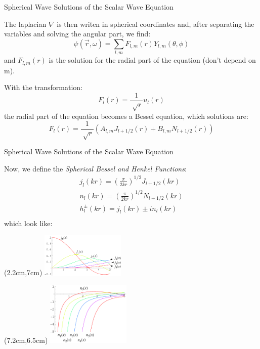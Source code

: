 \documentclass[10pt]{beamer}
\begin{document}
\begin{frame}[fragile]{Spherical Wave Solutions of the Scalar Wave Equation}

The laplacian $\nabla$ is then writen in spherical coordinates and, after separating the variables and solving the angular part, we find:
  \begin{equation*}
    \psi(\vec{r},\omega)=\sum_{l,m}F_{l,m}(r)Y_{l,m}(\theta,\phi)
  \end{equation*}
and $F_{l,m}(r)$ is the solution for the radial part of the equation (don't depend on m).

With the transformation:
  \begin{equation*}
      F_l(r)=\frac{1}{\sqrt[]{r}}u_l(r)
  \end{equation*}
the radial part of the equation becomes a Bessel equation, which solutions are:
\begin{equation*}
F_l(r)=\frac{1}{\sqrt[]{r}}\left( A_{l,m}J_{l+1/2}(r) + B_{l,m}N_{l+1/2}(r) \right)
\end{equation*}

\end{frame}


\begin{frame}[fragile]{Spherical Wave Solutions of the Scalar Wave Equation}

Now, we define the \emph{Spherical Bessel and Henkel Functions}:
  \begin{equation*}
    \begin{split}
      j_l(kr)=\left(\frac{\pi}{2kr}\right)^{1/2}J_{l+1/2}(kr)\\
      n_l(kr)=\left(\frac{\pi}{2kr}\right)^{1/2}N_{l+1/2}(kr)\\
      h_l^{\pm}(kr)=j_l(kr)\pm i n_l(kr)\\
    \end{split}
  \end{equation*}
which look like:
        \begin{textblock*}{3cm}(2.2cm,7cm)
        \includegraphics[width=4cm]{besselesf1}
        \end{textblock*}
        \begin{textblock*}{3cm}(7.2cm,6.5cm)
        \includegraphics[width=4cm]{besselesf2}
        \end{textblock*}

\end{frame}
\end{document}
